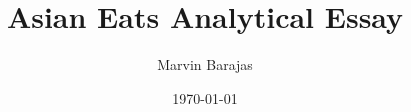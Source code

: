 \documentclass[12pt]{article}
\title{Asian Eats Analytical Essay}
\author{Marvin Barajas}
\date{\today}				%
\begin{document}
\doublespacing                         %
\maketitle                              %
\pagebreak


\end{document}
